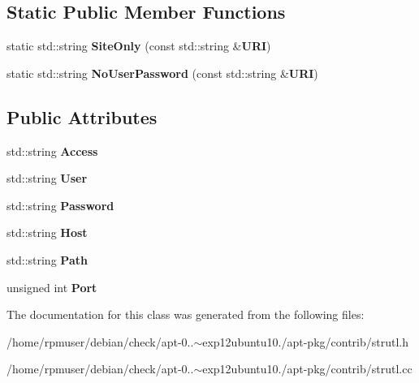 \subsection*{\-Static \-Public \-Member \-Functions}
\begin{DoxyCompactItemize}
\item 
static std\-::string {\bfseries \-Site\-Only} (const std\-::string \&{\bf \-U\-R\-I})\label{classURI_aac008edf927c8dcfd400259a89de527a}

\item 
static std\-::string {\bfseries \-No\-User\-Password} (const std\-::string \&{\bf \-U\-R\-I})\label{classURI_aca22b97e23aa6456244bf8381d1fbe09}

\end{DoxyCompactItemize}
\subsection*{\-Public \-Attributes}
\begin{DoxyCompactItemize}
\item 
std\-::string {\bfseries \-Access}\label{classURI_a006a979c4801f6b6ceb33cb3acd6dc89}

\item 
std\-::string {\bfseries \-User}\label{classURI_a942d24133f1862366615a0e2acc3df39}

\item 
std\-::string {\bfseries \-Password}\label{classURI_aa73588b6ca334ed3b3809b0e36169295}

\item 
std\-::string {\bfseries \-Host}\label{classURI_a9c4801d09d1e1b363caa3f06c56a3c9c}

\item 
std\-::string {\bfseries \-Path}\label{classURI_a351e85bde61ab21378ab709e884be9ca}

\item 
unsigned int {\bfseries \-Port}\label{classURI_a6043f0f3318721543d90305cd4d1e438}

\end{DoxyCompactItemize}


\-The documentation for this class was generated from the following files\-:\begin{DoxyCompactItemize}
\item 
/home/rpmuser/debian/check/apt-\/0..$\sim$exp12ubuntu10./apt-\/pkg/contrib/strutl.\-h\item 
/home/rpmuser/debian/check/apt-\/0..$\sim$exp12ubuntu10./apt-\/pkg/contrib/strutl.\-cc\end{DoxyCompactItemize}
